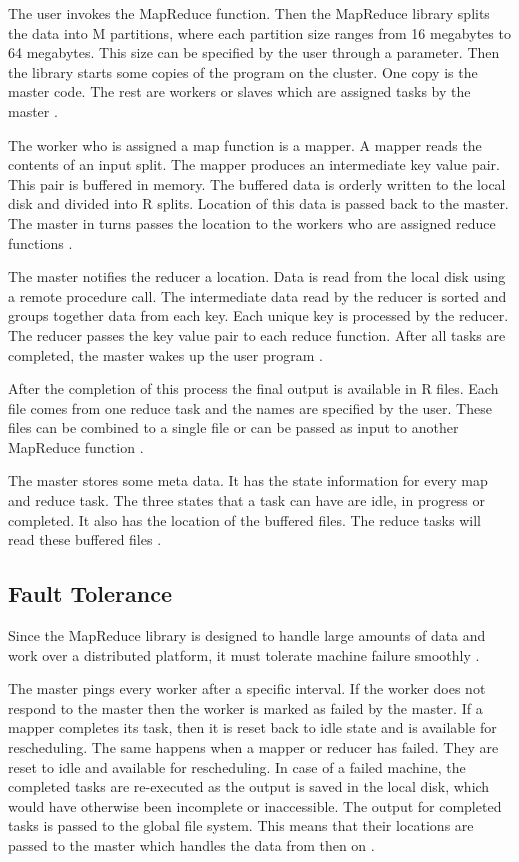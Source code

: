 \documentclass[sigconf]{acmart}
\begin{document}
The user invokes the MapReduce function. Then the MapReduce library splits the data into M partitions, where each partition size ranges from 16 megabytes to 64 megabytes. This size can be specified by the user through a parameter. Then the library starts some copies of the program on the cluster. One copy is the master code. The rest are workers or slaves which are assigned tasks by the master \cite{rf2}. 

The worker who is assigned a map function is a mapper. A mapper reads the contents of an input split. The mapper produces an intermediate key value pair. This pair is buffered in memory. The buffered data is orderly written to the local disk and divided into R splits. Location of this data is passed back to the master. The master in turns passes the location to the workers who are assigned reduce functions \cite{rf2}. 

The master notifies the reducer a location. Data is read from the local disk using a remote procedure call. The intermediate data read by the reducer is sorted and groups together data from each key. Each unique key is processed by the reducer. The reducer passes the key value pair to each reduce function. After all tasks are completed, the master wakes up the user program \cite{rf2}. 

After the completion of this process the final output is available in R files. Each file comes from one reduce task and the names are specified by the user.   These files can be combined to a single file or can be passed as input to another MapReduce function \cite{rf2}. 

The master stores some meta data. It has the state information for every map and reduce task. The three states that a task can have are idle, in progress or completed. It also has the location of the buffered files. The reduce tasks will read these buffered files \cite{rf2}.

\subsection{Fault Tolerance}
Since the MapReduce library is designed to handle large amounts of data and work over a distributed platform, it must tolerate machine failure smoothly \cite{rf2}. 

The master pings every worker after a specific interval. If the worker does not respond to the master then the worker is marked as failed by the master. If a mapper completes its task, then it is reset back to idle state and is available for rescheduling. The same happens when a mapper or reducer has failed. They are reset to idle and available for rescheduling. In case of a failed machine, the completed tasks are re-executed as the output is saved in the local disk, which would have otherwise been incomplete or inaccessible. The output for completed tasks is passed to the global file system. This means that their locations are passed to the master which handles the data from then on \cite{rf2}.  
\end{document}

